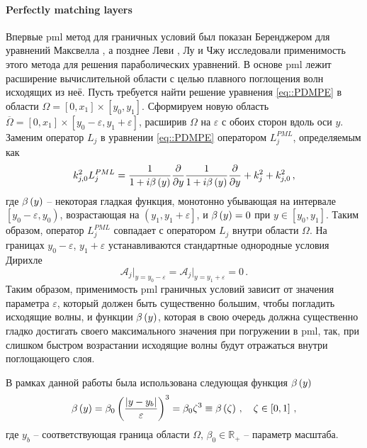 \documentclass[../document.tex]{subfiles}
\begin{document}
                \paragraph{Perfectly matching layers\label{sec::PML}}
                    \par Впервые \acrshort{pml} метод для граничных условий был показан Беренджером для уравнений Максвелла \cite{berenger}, а позднее Леви \cite{levy}, Лу и Чжу \cite{lu} исследовали применимость этого метода для решения параболических уравнений. В основе \acrshort{pml} лежит расширение вычислительной области с целью плавного поглощения волн исходящих из неё. Пусть требуется найти решение уравнения \eqref{eq::PDMPE} в области $\Omega=\left[0,x_1\right]\times\left[y_0,y_1\right]$. Сформируем новую область $\overline{\Omega}=\left[0,x_1\right]\times\left[y_0-\varepsilon,y_1+\varepsilon\right]$, расширив $\Omega$ на $\varepsilon$ с обоих сторон вдоль оси $y$. Заменим оператор $L_j$ в уравнении \eqref{eq::PDMPE} оператором $L_j^{PML}$, определяемым как
                    \begin{equation}\label{eq::LPML}
                        k_{j,0}^2L_j^{PML}=\frac{1}{1+i\beta\left(y\right)}\frac{\partial}{\partial y}\frac{1}{1+i\beta\left(y\right)}\frac{\partial}{\partial y}+k_j^2+k_{j,0}^2\,,
                    \end{equation}
                    где $\beta\left(y\right)$ -- некоторая гладкая функция, монотонно убывающая на интервале\\ $\left[y_0-\varepsilon,y_0\right)$, возрастающая на $\left(y_1,y_1+\varepsilon\right]$, и $\beta\left(y\right)=0$ при $y\in\left[y_0,y_1\right]$. Таким образом, оператор $L_j^{PML}$ совпадает с оператором $L_j$ внутри области $\Omega$. На границах $y_0-\varepsilon$, $y_1+\varepsilon$ устанавливаются стандартные однородные условия Дирихле
                    \begin{equation}
                        \mathcal{A}_j\bigr|_{y=y_0-\varepsilon}=\mathcal{A}_j\bigr|_{y=y_1+\varepsilon}=0\,.
                    \end{equation}
                    Таким образом, применимость \acrshort{pml} граничных условий зависит от значения параметра $\varepsilon$, который должен быть существенно большим, чтобы погладить исходящие волны, и функции $\beta\left(y\right)$, которая в свою очередь должна существенно гладко достигать своего максимального значения при погружении в \acrshort{pml}, так, при слишком быстром возрастании исходящие волны будут отражаться внутри поглощающего слоя.
                    \par В рамках данной работы была использована следующая функция $\beta\left(y\right)$
                    \begin{equation}\label{eq::betay}
                        \beta\left(y\right)=\beta_0\left(\frac{\left|y-y_b\right|}{\varepsilon}\right)^3=\beta_0\zeta^3\equiv\beta\left(\zeta\right)\,,\quad\zeta\in\left[0, 1\right]\,,
                    \end{equation}
                    где $y_b$ -- соответствующая граница области $\Omega$, $\beta_0\in\mathbb{R}_{+}$ -- параметр масштаба.
\end{document}
